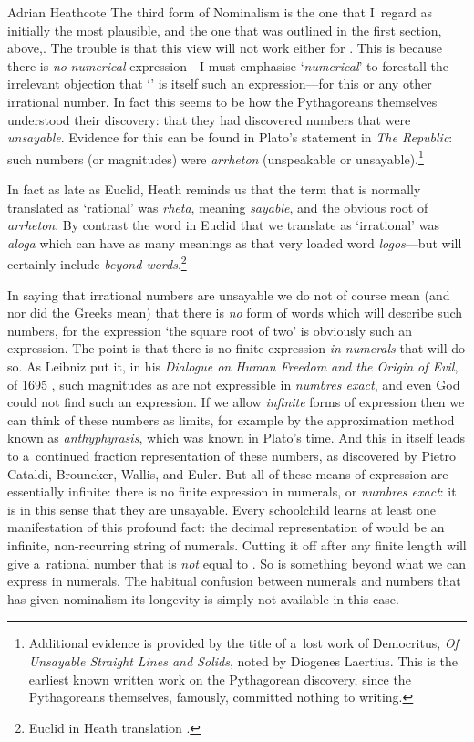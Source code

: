 \begin{artengenv}{Adrian Heathcote}
The third form of Nominalism is the one that I~regard as initially the most plausible, and the one that was outlined in the first section, above,. The trouble is that this view will not work either for \sqrtwo. This is because there is \textit{no} \textit{numerical} expression---I must emphasise `\textit{numerical}' to forestall the irrelevant objection that `\sqrtwo' is itself such an expression---for this or any other irrational number. In fact this seems to be how the Pythagoreans themselves understood their discovery: that they had discovered numbers that were \textit{unsayable}. Evidence for this can be found in Plato's statement in \textit{The Republic}: such numbers (or magnitudes) were \textit{arrheton} (unspeakable or unsayable).\footnote{Additional evidence is provided by the title of a~lost work of Democritus, \textit{Of Unsayable Straight Lines and Solids}, noted by Diogenes Laertius. This is the earliest known written work on the Pythagorean discovery, since the Pythagoreans themselves, famously, committed nothing to writing.}


In fact as late as Euclid, Heath reminds us that the term that is normally translated as `rational' was \emph{rheta}, meaning \textit{sayable}, and the obvious root of \textit{arrheton}. By contrast the word in Euclid that we translate as `irrational' was \emph{aloga} which can have as many meanings as that very loaded word \textit{logos}---but will certainly include \textit{beyond words}.\footnote{Euclid in Heath translation \parencite{euclid_thirteen_1956}.}

In saying that irrational numbers are unsayable we do not of course mean (and nor did the Greeks mean) that there is \textit{no} form of words which will describe such numbers, for the expression `the square root of two' is obviously such an expression. The point is that there is no finite expression \textit{in numerals} that will do so. As Leibniz put it, in his \textit{Dialogue on Human Freedom and the Origin of Evil}, of 1695 \parencite{leibniz_dialogue_1989}, such magnitudes as \sqrtwo are not expressible in \textit{numbres exact}, and even God could not find such an expression. If we allow \textit{infinite} forms of expression then we can think of these numbers as limits, for example by the approximation method known as \textit{anthyphyrasis}, which was known in Plato's time. And this in itself leads to a~continued fraction representation of these numbers, as discovered by Pietro Cataldi, Brouncker, Wallis, and Euler. But all of these means of expression are essentially infinite: there is no finite expression in numerals, or \textit{numbres exact}: it is in this sense that they are unsayable. Every schoolchild learns at least one manifestation of this profound fact: the decimal representation of \sqrtwo would be an infinite, non-recurring string of numerals. Cutting it off after any finite length will give a~rational number that is \textit{not} equal to \sqrtwo. So \sqrtwo is something beyond what we can express in numerals. The habitual confusion between numerals and numbers that has given nominalism its longevity is simply not available in this case.


\end{artengenv}
